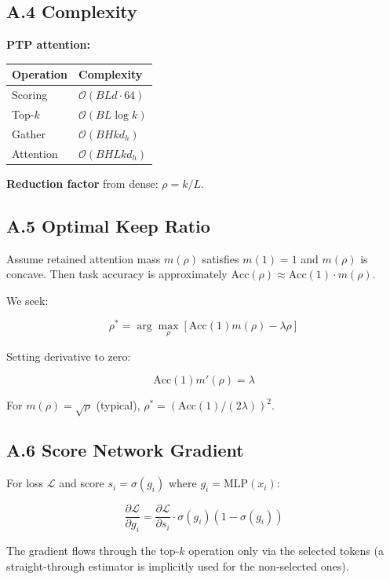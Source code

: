 \subsection{A.4 Complexity}

\textbf{PTP attention:}

\begin{table}[H]
\centering
\small
\begin{tabular}{ll}
\toprule
\textbf{Operation} & \textbf{Complexity} \\
\midrule
Scoring & $\mathcal{O}(B L d \cdot 64)$ \\
Top-$k$ & $\mathcal{O}(B L \log k)$ \\
Gather & $\mathcal{O}(B H k d_h)$ \\
Attention & $\mathcal{O}(B H L k d_h)$ \\
\bottomrule
\end{tabular}
\end{table}

\textbf{Reduction factor} from dense: $\rho = k / L$.

\subsection{A.5 Optimal Keep Ratio}

Assume retained attention mass $m(\rho)$ satisfies $m(1) = 1$ and 
$m(\rho)$ is concave. Then task accuracy is approximately 
$\text{Acc}(\rho) \approx \text{Acc}(1) \cdot m(\rho)$.

We seek:

\[
\rho^* = \arg\max_\rho \left[\text{Acc}(1) m(\rho) - \lambda \rho\right]
\tag{A.2}
\]

Setting derivative to zero:

\[
\text{Acc}(1) m'(\rho) = \lambda
\tag{A.3}
\]

For $m(\rho) = \sqrt{\rho}$ (typical), $\rho^* = (\text{Acc}(1) / (2\lambda))^2$.

\subsection{A.6 Score Network Gradient}

For loss $\mathcal{L}$ and score $s_i = \sigma(g_i)$ where 
$g_i = \text{MLP}(x_i)$:

\[
\frac{\partial \mathcal{L}}{\partial g_i} = \frac{\partial \mathcal{L}}{\partial s_i} \cdot \sigma(g_i)(1 - \sigma(g_i))
\tag{A.4}
\]

The gradient flows through the top-$k$ operation only via the selected 
tokens (a straight-through estimator is implicitly used for the 
non-selected ones).

